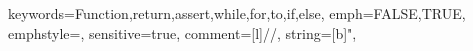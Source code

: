 {keywords={Function,return,assert,while,for,to,if,else},%
emph={FALSE,TRUE},
emphstyle=\color{colconst},
sensitive=true,%
comment=[l]{//},%
string=[b]",%
}
